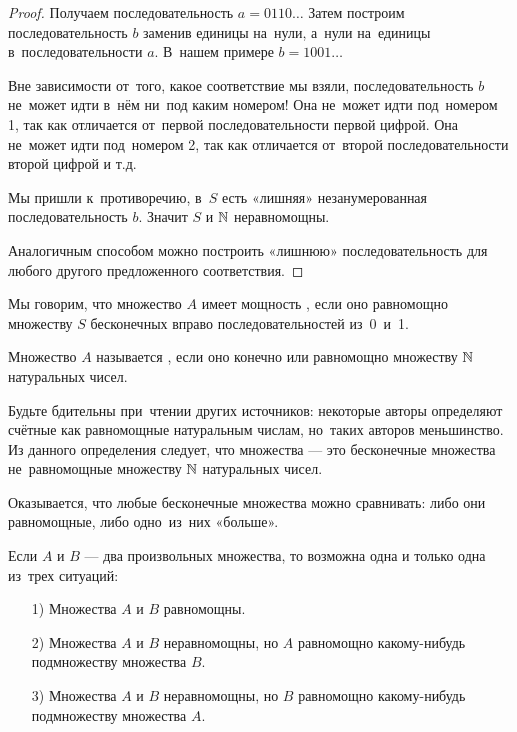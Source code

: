 \documentclass[12pt, a4paper]{article}
\begin{document}
\begin{proof}
Получаем последовательность $a=0110\ldots$ Затем построим последовательность $b$ заменив единицы на~нули, а~нули на~единицы в~последовательности $a$. В~нашем примере $b=1001\ldots $

Вне зависимости от~того, какое соответствие мы взяли, последовательность $b$ не~может идти в~нём ни~под каким номером! Она не~может идти под~номером 1, так как отличается от~первой последовательности первой цифрой. Она не~может идти под~номером 2, так как отличается от~второй последовательности второй цифрой и т.д.

Мы пришли к~противоречию, в~$S$ есть «лишняя» незанумерованная последовательность $b$. Значит $S$ и $\mathbb N$ неравномощны.

Аналогичным способом можно построить «лишнюю» последовательность для любого другого предложенного соответствия.
\end{proof}

\begin{mydef} Мы говорим, что множество $A$ имеет мощность ,  если оно равномощно множеству $S$ бесконечных вправо последовательностей из~0~и~1.
\end{mydef}

\begin{mydef} Множество $A$ называется ,  если оно конечно или равномощно множеству $\mathbb N$ натуральных чисел.
\end{mydef}

Будьте бдительны при~чтении других источников: некоторые авторы определяют счётные как равномощные натуральным числам, но~таких авторов меньшинство. Из данного определения следует, что   множества --- это бесконечные множества не~равномощные множеству $\mathbb N$ натуральных чисел.

Оказывается, что любые бесконечные множества можно сравнивать: либо они равномощные, либо одно~из~них «больше».

\begin{myth} Если $A$ и $B$ --- два произвольных множества, то возможна одна и только одна из~трех ситуаций:
    \begin{itemize}
        \item[1)] Множества $A$ и $B$ равномощны.
        \item[2)] Множества $A$ и $B$ неравномощны, но $A$ равномощно какому-нибудь подмножеству множества $B$.
        \item[3)] Множества $A$ и $B$ неравномощны, но $B$ равномощно какому-нибудь подмножеству множества $A$.
    \end{itemize}
\end{myth}
\end{document}
